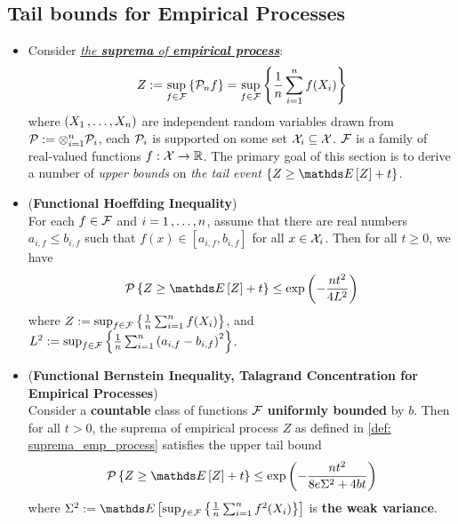 \documentclass[11pt]{article}
\begin{document}
\subsection{Tail bounds for Empirical Processes}
\begin{itemize}
\item \begin{remark}
Consider \underline{\emph{the \textbf{suprema} of \textbf{empirical process}}}:
\begin{align}
Z := \sup_{f \in {\mathcal F}}\left\{{\mathcal P}_n f\right\} =  \sup_{f \in {\mathcal F}}\left\{ \frac{1}{n}\sum_{i=1}^n f(X_i)\right\} \label{def: suprema_emp_process}
\end{align} where $(X_1 \,{,}\ldots{,}\, X_n)$ are independent random variables drawn from ${\mathcal P} := \otimes_{i=1}^{n}{\mathcal P}_i$,  each ${\mathcal P}_i$ is supported on some set ${\mathcal X}_i \subseteq {\mathcal X}$.  ${\mathcal F}$ is a family of real-valued functions $f: {\mathcal X} \to {\mathbb R}$. The primary goal of this section is to derive a number of \emph{upper bounds} on \emph{the tail event} $\set{Z \ge \E{}{Z} + t}$.
\end{remark}

\item \begin{theorem}  (\textbf{Functional Hoeffding Inequality}) \citep{wainwright2019high, boucheron2013concentration}\\
For each $f \in {\mathcal F}$ and $i = 1 \,{,}\ldots{,}\, n$, assume that there are real numbers $a_{i,f} \le b_{i,f}$ such that $f(x) \in [a_{i,f},  b_{i,f}]$ for all $x \in {\mathcal X}_i$.
Then for all $t \ge 0$, we have
\begin{align}
\cP\set{Z \ge \E{}{Z} + t} \le \exp\paren{-\frac{n t^2}{4 L^2}} \label{ineqn: hoeffding_inequality_functional}
\end{align} where $Z :=\sup_{f \in {\mathcal F}}\left\{ \frac{1}{n}\sum_{i=1}^n f(X_i)\right\}$, and $L^2 := \sup_{f \in {\mathcal F}}\left\{\frac{1}{n}\sum_{i=1}^{n}\left(a_{i,f} - b_{i,f}\right)^2\right\}$.
\end{theorem}

\item \begin{theorem}(\textbf{Functional Bernstein Inequality, Talagrand Concentration for Empirical Processes})  \citep{wainwright2019high, boucheron2013concentration}\\
Consider a \textbf{countable} class of functions ${\mathcal F}$ \textbf{uniformly bounded} by $b$. Then for all  $t > 0$, the suprema of empirical process $Z$ as defined in \eqref{def: suprema_emp_process} satisfies the upper tail bound
\begin{align}
\cP\set{Z \ge \E{}{Z} + t} \le \exp\paren{-\frac{n t^2}{8e\Sigma^2 + 4bt}} \label{ineqn: bernstein_inequality_functional}
\end{align} where $\Sigma^2 := \E{}{\sup_{f \in \cF}\set{\frac{1}{n}\sum_{i=1}^{n}f^2(X_i)}}$ is \textbf{the weak variance}.
\end{theorem}


\end{itemize}
\end{document}
